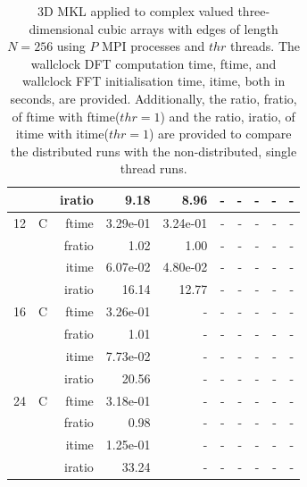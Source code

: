 \documentclass[a4paper]{article}
\begin{document}
\begin{table}[htbp]
\begin{center}
\begin{small}
\begin{tabular}{|r|r|r|r|r|r|r|r|r|r|}
          &      & iratio & 9.18 & 8.96 &     -     &     -     &     -     &     -     &     -     \\ \hline 
     12 & C & ftime & 3.29e-01 & 3.24e-01 &     -     &     -     &     -     &     -     &     -     \\   
          &      & fratio & 1.02 & 1.00 &     -     &     -     &     -     &     -     &     -     \\   
          &      & itime & 6.07e-02 & 4.80e-02 &     -     &     -     &     -     &     -     &     -     \\   
          &      & iratio & 16.14 & 12.77 &     -     &     -     &     -     &     -     &     -     \\ \hline 
     16 & C & ftime & 3.26e-01 &     -     &     -     &     -     &     -     &     -     &     -     \\   
          &      & fratio & 1.01 &     -     &     -     &     -     &     -     &     -     &     -     \\   
          &      & itime & 7.73e-02 &     -     &     -     &     -     &     -     &     -     &     -     \\   
          &      & iratio & 20.56 &     -     &     -     &     -     &     -     &     -     &     -     \\ \hline 
     24 & C & ftime & 3.18e-01 &     -     &     -     &     -     &     -     &     -     &     -     \\   
          &      & fratio & 0.98 &     -     &     -     &     -     &     -     &     -     &     -     \\   
          &      & itime & 1.25e-01 &     -     &     -     &     -     &     -     &     -     &     -     \\   
          &      & iratio & 33.24 &     -     &     -     &     -     &     -     &     -     &     -     \\ \hline 

\end{tabular}
\caption{3D MKL applied to complex valued three-dimensional cubic arrays with edges of length $N=256$ using $P$ MPI processes and $thr$ threads. The wallclock DFT computation time, ftime, and wallclock FFT initialisation time, itime, both in seconds, are provided. Additionally, the ratio, fratio, of ftime  with ftime($thr=1$) and the ratio, iratio, of itime  with itime($thr=1$) are provided to compare the distributed runs with the non-distributed, single thread runs.  }\label{TblMKL3d256c}
\end{small}
\end{center}
\end{table}
\end{document}
